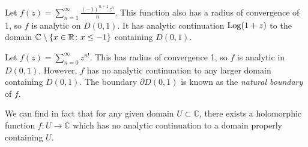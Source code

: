 \begin{example}
	Let \( f(z) = \sum_{n=1}^\infty \frac{(-1)^{n+1} z^n}{n} \).
	This function also has a radius of convergence of 1, so \( f \) is analytic on \( D(0,1) \).
	It has analytic continuation \( \operatorname{Log}(1+z) \) to the domain \( \mathbb C \setminus \qty{x \in \mathbb R \colon x \leq -1} \) containing \( D(0,1) \).
\end{example}
\begin{example}
	Let \( f(z) = \sum_{n=0}^\infty z^{n!} \).
	This has radius of convergence 1, so \( f \) is analytic in \( D(0,1) \).
	However, \( f \) has no analytic continuation to any larger domain containing \( D(0,1) \).
	The boundary \( \partial D(0,1) \) is known as the \textit{natural boundary} of \( f \).
\end{example}
We can find in fact that for any given domain \( U \subset \mathbb C \), there exists a holomorphic function \( f \colon U \to \mathbb C \) which has no analytic continuation to a domain properly containing \( U \).

